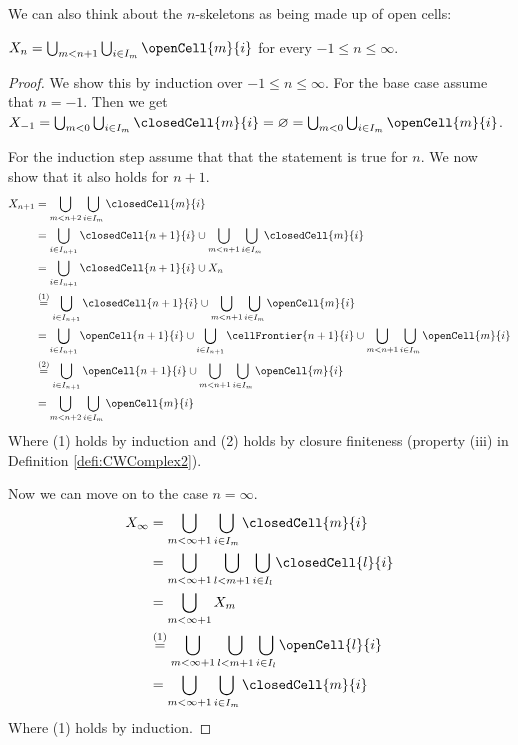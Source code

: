 We can also think about the $n$-skeletons as being made up of open cells:

\begin{lem}\label{lem:skeletonunionopenCell}
    $X_n = \bigcup_{m < n + 1}\bigcup_{i \in I_m} \openCell{m}{i}$ for every $-1 \le n \le \infty$.
\end{lem}
\begin{proof}
    We show this by induction over $-1 \le n \le \infty$.
    For the base case assume that $n = -1$.
    Then we get $X_{-1} = \bigcup_{m < 0}\bigcup_{i \in I_m}\closedCell{m}{i} = \varnothing = \bigcup_{m < 0}\bigcup_{i \in I_m} \openCell{m}{i}$.

    For the induction step assume that that the statement is true for $n$.
    We now show that it also holds for $n + 1$.
    \begin{equation*}
        \begin{split}
            X_{n + 1} &= \bigcup_{m < n + 2}\bigcup_{i \in I_m} \closedCell{m}{i} \\
            &=\bigcup_{i \in I_{n + 1}}\closedCell{n+1}{i} \cup \bigcup_{m < n + 1}\bigcup_{i \in I_m} \closedCell{m}{i} \\
            &= \bigcup_{i \in I_{n + 1}}\closedCell{n+1}{i} \cup X_n \\
            &\stackrel{(1)}{=} \bigcup_{i \in I_{n + 1}}\closedCell{n+1}{i} \cup \bigcup_{m < n + 1}\bigcup_{i \in I_m} \openCell{m}{i} \\
            &= \bigcup_{i \in I_{n + 1}}\openCell{n+1}{i} \cup \bigcup_{i \in I_{n + 1}}\cellFrontier{n+1}{i} \cup \bigcup_{m < n + 1}\bigcup_{i \in I_m} \openCell{m}{i} \\
            &\stackrel{(2)}{=} \bigcup_{i \in I_{n + 1}}\openCell{n+1}{i} \cup \bigcup_{m < n + 1}\bigcup_{i \in I_m} \openCell{m}{i} \\
            &= \bigcup_{m < n + 2}\bigcup_{i \in I_m} \openCell{m}{i}
        \end{split}
    \end{equation*}
    Where (1) holds by induction and (2) holds by closure finiteness (property (iii) in Definition \ref{defi:CWComplex2}).

    Now we can move on to the case $n = \infty$.
    \begin{equation*}
        \begin{split}
            X_{\infty} &= \bigcup_{m < \infty + 1}\bigcup_{i \in I_m}\closedCell{m}{i} \\
            &= \bigcup_{m < \infty + 1}\bigcup_{l < m + 1}\bigcup_{i \in I_l}\closedCell{l}{i} \\
            &= \bigcup_{m < \infty + 1} X_m \\
            &\stackrel{(1)}{=} \bigcup_{m < \infty + 1}\bigcup_{l < m + 1}\bigcup_{i \in I_l}\openCell{l}{i} \\
            &= \bigcup_{m < \infty + 1}\bigcup_{i \in I_m}\closedCell{m}{i}
        \end{split}
    \end{equation*}
    Where (1) holds by induction.
\end{proof}

